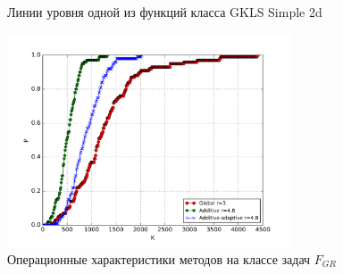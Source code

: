 \begin{figure}[ht]
    \centering
    \qquad
    \caption{Линии уровня одной из функций класса GKLS Simple 2d}
    \label{fig:gkls_isolines}
\end{figure}

\begin{figure}[ht]
  	\center
    \includegraphics[width=0.75\textwidth]{images/grishagin.png}
    \caption{Операционные характеристики методов на классе задач \(F_{GR}\)}
    \label{fig:grishh_op}
\end{figure}

